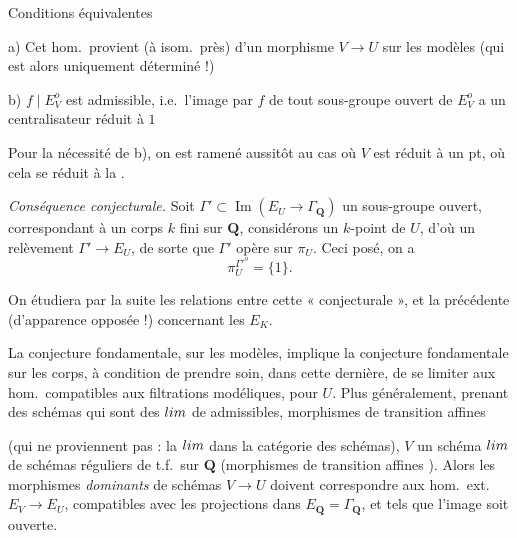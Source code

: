 \documentclass[11pt,a4paper]{article}
\begin{document}
Conditions équivalentes

a) Cet hom.\ provient (à isom.\ près) d'un morphisme $V \to U$ sur les modèles
(qui est alors uniquement déterminé !)

b) $f \mid E_V^{o}$ est admissible, i.e.\ l'image par $f$ de tout sous-groupe
ouvert de $E_V^{o}$ a un centralisateur réduit à $1$

Pour la nécessité de b), on est ramené aussitôt au cas où $V$ est réduit à un
pt, où cela se réduit à la .

\emph{Conséquence conjecturale.} Soit
$\Gamma' \subset \operatorname{Im}(E_U \to \Gamma_{\mathbf{Q}})$ un sous-groupe
ouvert, correspondant à un corps $k$ fini sur $\mathbf{Q}$, considérons un
$k$-point de $U$, d'où un relèvement $\Gamma' \to E_U$, de sorte que $\Gamma'$
opère sur $\pi_U$. Ceci posé, on a
\[
  \pi_U^{\Gamma'^{o}} = \{1\}.
\]

On étudiera par la suite les relations entre cette 
« conjecturale », et la précédente (d'apparence opposée !) concernant les
$E_K$.

La conjecture fondamentale, sur les modèles, implique la conjecture
fondamentale sur les corps, à condition de prendre soin, dans cette dernière,
de se limiter aux hom.\ compatibles aux filtrations modéliques,
 pour $U$. Plus généralement, prenant des schémas
qui sont des $\varprojlim$ de  
\struck{\ill{}} admissibles, \struck{\ill{}} 
morphismes de transition affines

(qui ne proviennent pas : la $\varprojlim$ dans la catégorie des schémas),
\struck{\ill{}}  $V$ un schéma $\varprojlim$ de schémas
 réguliers de t.f.\ sur $\mathbf{Q}$ (morphismes de
transition affines  ). Alors les
morphismes \emph{dominants} de schémas $V \to U$ doivent correspondre aux hom.\
ext.\ $E_V \to E_U$, compatibles avec les projections dans
$E_{\mathbf{Q}} = \Gamma_{\mathbf{Q}}$, et tels que l'image soit ouverte.
\end{document}
